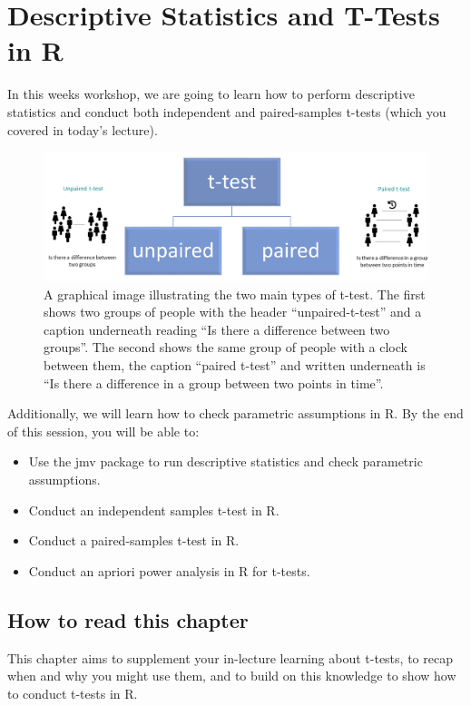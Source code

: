 \documentclass[
]{book}
\begin{document}
\chapter{Descriptive Statistics and T-Tests in R}\label{descriptive-statistics-and-t-tests-in-r}

In this weeks workshop, we are going to learn how to perform descriptive statistics and conduct both independent and paired-samples t-tests (which you covered in today's lecture).

\begin{figure}
\centering
\includegraphics{img/05-T-tests.png}
\caption{A graphical image illustrating the two main types of t-test. The first shows two groups of people with the header ``unpaired-t-test'' and a caption underneath reading ``Is there a difference between two groups''. The second shows the same group of people with a clock between them, the caption ``paired t-test'' and written underneath is ``Is there a difference in a group between two points in time''.}
\end{figure}

Additionally, we will learn how to check parametric assumptions in R. By the end of this session, you will be able to:

\begin{itemize}
\item
  Use the jmv package to run descriptive statistics and check parametric assumptions.
\item
  Conduct an independent samples t-test in R.
\item
  Conduct a paired-samples t-test in R.
\item
  Conduct an apriori power analysis in R for t-tests.
\end{itemize}

\section{How to read this chapter}\label{how-to-read-this-chapter-2}

This chapter aims to supplement your in-lecture learning about t-tests, to recap when and why you might use them, and to build on this knowledge to show how to conduct t-tests in R.
\end{document}
